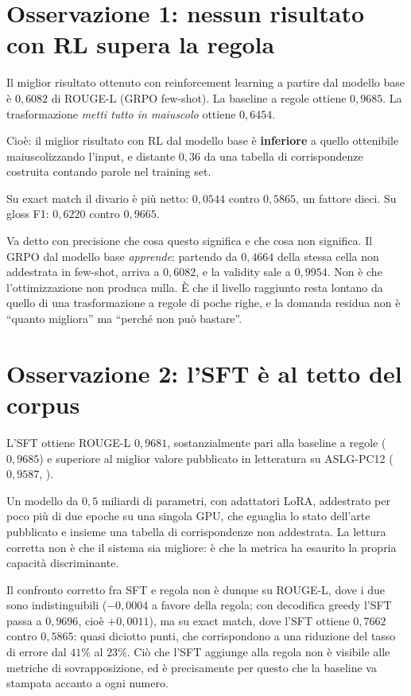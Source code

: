 \section{Osservazione 1: nessun risultato con RL supera la regola}

Il miglior risultato ottenuto con reinforcement learning a partire dal modello
base è $0{,}6082$ di ROUGE-L (GRPO few-shot). La baseline a regole ottiene
$0{,}9685$. La trasformazione \emph{metti tutto in maiuscolo} ottiene $0{,}6454$.

Cioè: il miglior risultato con RL dal modello base è \textbf{inferiore} a quello
ottenibile maiuscolizzando l'input, e distante $0{,}36$ da una tabella di
corrispondenze costruita contando parole nel training set.

Su exact match il divario è più netto: $0{,}0544$ contro $0{,}5865$, un fattore
dieci. Su gloss F1: $0{,}6220$ contro $0{,}9665$.

Va detto con precisione che cosa questo significa e che cosa non significa. Il
GRPO dal modello base \emph{apprende}: partendo da $0{,}4664$ della stessa cella
non addestrata in few-shot, arriva a $0{,}6082$, e la validity sale a $0{,}9954$.
Non è che l'ottimizzazione non produca nulla. È che il livello raggiunto resta
lontano da quello di una trasformazione a regole di poche righe, e la domanda
residua non è ``quanto migliora'' ma ``perché non può bastare''.

\section{Osservazione 2: l'SFT è al tetto del corpus}

L'SFT ottiene ROUGE-L $0{,}9681$, sostanzialmente pari alla baseline a regole
($0{,}9685$) e superiore al miglior valore pubblicato in letteratura su
ASLG-PC12 ($0{,}9587$, \cite{peng2023monolingual}).

Un modello da $0{,}5$ miliardi di parametri, con adattatori LoRA, addestrato per
poco più di due epoche su una singola GPU, che eguaglia lo stato dell'arte pubblicato e
insieme una tabella di corrispondenze non addestrata. La lettura corretta non è
che il sistema sia migliore: è che la metrica ha esaurito la propria capacità
discriminante.

Il confronto corretto fra SFT e regola non è dunque su ROUGE-L, dove i due sono
indistinguibili ($-0{,}0004$ a favore della regola; con decodifica greedy l'SFT
passa a $0{,}9696$, cioè $+0{,}0011$), ma su exact match, dove l'SFT ottiene
$0{,}7662$ contro $0{,}5865$: quasi diciotto punti, che corrispondono a una
riduzione del tasso di errore dal $41\%$ al $23\%$. Ciò che l'SFT aggiunge alla
regola non è visibile alle metriche di sovrapposizione, ed è precisamente per
questo che la baseline va stampata accanto a ogni numero.

